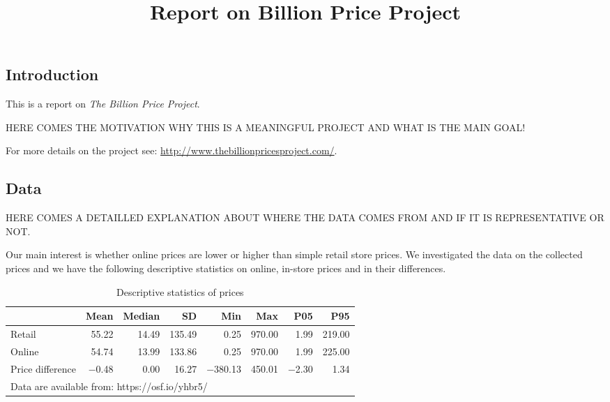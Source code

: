\documentclass[
]{article}
\title{Report on Billion Price Project}
\author{}
\date{\vspace{-2.5em}}
\begin{document}
\maketitle

\hypertarget{introduction}{%
\subsection{Introduction}\label{introduction}}

This is a report on \emph{The Billion Price Project}.

HERE COMES THE MOTIVATION WHY THIS IS A MEANINGFUL PROJECT AND WHAT IS
THE MAIN GOAL!

For more details on the project see:
\url{http://www.thebillionpricesproject.com/}.

\hypertarget{data}{%
\subsection{Data}\label{data}}

HERE COMES A DETAILLED EXPLANATION ABOUT WHERE THE DATA COMES FROM AND
IF IT IS REPRESENTATIVE OR NOT.

Our main interest is whether online prices are lower or higher than
simple retail store prices. We investigated the data on the collected
prices and we have the following descriptive statistics on online,
in-store prices and in their differences.

\begin{table}[!h]

\caption{\label{tab:unnamed-chunk-1}Descriptive statistics of prices}
\centering
\begin{tabular}[t]{lrrrrrrr}
\toprule
  & Mean & Median & SD & Min & Max & P05 & P95\\
\midrule
Retail & \num{55.22} & \num{14.49} & \num{135.49} & \num{0.25} & \num{970.00} & \num{1.99} & \num{219.00}\\
Online & \num{54.74} & \num{13.99} & \num{133.86} & \num{0.25} & \num{970.00} & \num{1.99} & \num{225.00}\\
Price difference & \num{-0.48} & \num{0.00} & \num{16.27} & \num{-380.13} & \num{450.01} & \num{-2.30} & \num{1.34}\\
\bottomrule
\multicolumn{8}{l}{\rule{0pt}{1em}Data are available from: https://osf.io/yhbr5/}\\
\end{tabular}
\end{table}
\end{document}
